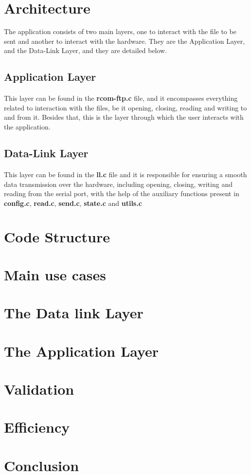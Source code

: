 \documentclass[11pt]{article}
\begin{document}
\section{Architecture}

The application consists of two main layers, one to interact with the file to be sent and another to interact with the hardware. They are the Application Layer, and the Data-Link Layer, and they are detailed below.

\subsection{Application Layer}

\paragraph{}This layer can be found in the \textbf{rcom-ftp.c} file, and it encompasses everything related to interaction with the files, be it opening, closing, reading and writing to and from it. Besides that, this is the layer through which the user interacts with the application.

\subsection{Data-Link Layer}

\paragraph{}This layer can be found in the \textbf{ll.c} file and it is responsible for ensuring a smooth data transmission over the hardware, including opening, closing, writing and reading from the serial port, with the help of the auxiliary functions present in \textbf{config.c}, \textbf{read.c}, \textbf{send.c}, \textbf{state.c} and \textbf{utils.c}

\section{Code Structure}

\section{Main use cases}

\section{The Data link Layer}

\section{The Application Layer}

\section{Validation}

\section{Efficiency}

\section{Conclusion}
\end{document}
